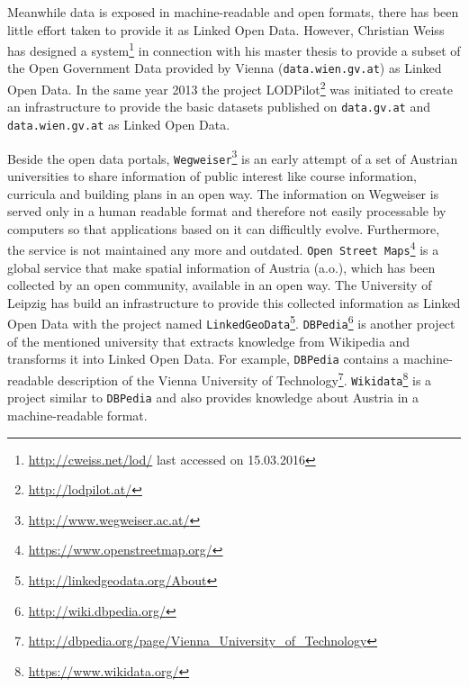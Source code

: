 \documentclass{article}
\begin{document}
Meanwhile data is exposed in machine-readable and open formats, there has been little effort taken to provide it as Linked Open Data. However, Christian Weiss has designed a system\footnote{\url{http://cweiss.net/lod/} last accessed on 15.03.2016} in connection with his master thesis\cite{weiss_transferring_2013} to provide a subset of the Open Government Data provided by Vienna (\texttt{data.wien.gv.at}) as Linked Open Data. In the same year 2013 the project LODPilot\footnote{\url{http://lodpilot.at/}} was initiated to create an infrastructure to provide the basic datasets published on \texttt{data.gv.at} and \texttt{data.wien.gv.at} as Linked Open Data.

Beside the open data portals, \texttt{Wegweiser}\footnote{\url{http://www.wegweiser.ac.at/}} is an early attempt of a set of Austrian universities to share information of public interest like course information, curricula and building plans in an open way. The information on Wegweiser is served only in a human readable format and therefore not easily processable by computers so that applications based on it can difficultly evolve. Furthermore, the service is not maintained any more and outdated. \texttt{Open Street Maps}\footnote{\url{https://www.openstreetmap.org/}} is a global service that make spatial information of Austria (a.o.), which has been collected by an open community, available in an open way. The University of Leipzig has build an infrastructure to provide this collected information as Linked Open Data with the project named \texttt{LinkedGeoData}\footnote{\url{http://linkedgeodata.org/About}}. \texttt{DBPedia}\footnote{\url{http://wiki.dbpedia.org/}} is another project of the mentioned university that extracts knowledge from Wikipedia and transforms it into Linked Open Data. For example, \texttt{DBPedia} contains a machine-readable description of the Vienna University of Technology\footnote{\url{http://dbpedia.org/page/Vienna_University_of_Technology}}. \texttt{Wikidata}\footnote{\url{https://www.wikidata.org/}} is a project similar to \texttt{DBPedia} and also provides knowledge about Austria in a machine-readable format.


\end{document}
